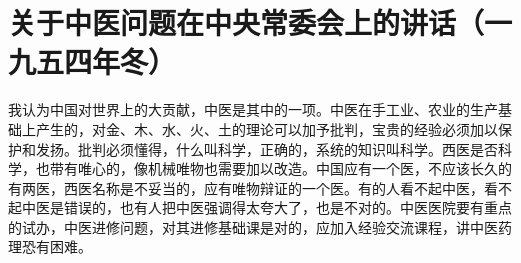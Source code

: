 \section[关于中医问题在中央常委会上的讲话（一九五四年冬）]{关于中医问题在中央常委会上的讲话（一九五四年冬）}


我认为中国对世界上的大贡献，中医是其中的一项。中医在手工业、农业的生产基础上产生的，对金、木、水、火、土的理论可以加予批判，宝贵的经验必须加以保护和发扬。批判必须懂得，什么叫科学，正确的，系统的知识叫科学。西医是否科学，也带有唯心的，像机械唯物也需要加以改造。中国应有一个医，不应该长久的有两医，西医名称是不妥当的，应有唯物辩证的一个医。有的人看不起中医，看不起中医是错误的，也有人把中医强调得太夸大了，也是不对的。中医医院要有重点的试办，中医进修问题，对其进修基础课是对的，应加入经验交流课程，讲中医药理恐有困难。


